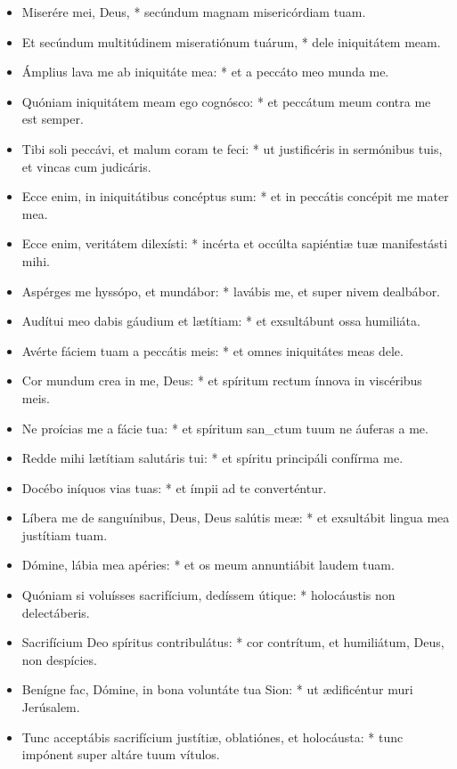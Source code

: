 \begin{itemize}[%
label=\null, %
leftmargin=0pt, %
itemindent=3mm, %
labelsep=0pt, %
labelwidth=0pt, %
rightmargin=0pt, %
parsep=0pt, %
topsep=0pt, %
itemsep=0pt]%


\item Miserére mei, Deus, * secúndum magnam misericórdiam tuam.
\item Et secúndum multitúdinem miseratiónum tuárum, * dele iniquitátem meam.
\item Ámplius lava me ab iniquitáte mea: * et a peccáto meo munda me.
\item Quóniam iniquitátem meam ego cognósco: * et peccátum meum contra me est semper.
\item Tibi soli peccávi, et malum coram te feci: * ut justificéris in sermónibus tuis, et vincas cum judicáris.
\item Ecce enim, in iniquitátibus concéptus sum: * et in peccátis concépit me mater mea.
\item Ecce enim, veritátem dilexísti: * incérta et occúlta sapiéntiæ tuæ manifestásti mihi.
\item Aspérges me hyssópo, et mundábor: * lavábis me, et super nivem dealbábor.
\item Audítui meo dabis gáudium et lætítiam: * et exsultábunt ossa humiliáta.
\item Avérte fáciem tuam a peccátis meis: * et omnes iniquitátes meas dele.
\item Cor mundum crea in me, Deus: * et spíritum rectum ínnova in viscéribus meis.
\item Ne proícias me a fácie tua: * et spíritum san\_ctum tuum ne áuferas a me.
\item Redde mihi lætítiam salutáris tui: * et spíritu principáli confírma me.
\item Docébo iníquos vias tuas: * et ímpii ad te converténtur.
\item Líbera me de sanguínibus, Deus, Deus salútis meæ: * et exsultábit lingua mea justítiam tuam.
\item Dómine, lábia mea apéries: * et os meum annuntiábit laudem tuam.
\item Quóniam si voluísses sacrifícium, dedíssem útique: * holocáustis non delectáberis.
\item Sacrifícium Deo spíritus contribulátus: * cor contrítum, et humiliátum, Deus, non despícies.
\item Benígne fac, Dómine, in bona voluntáte tua Sion: * ut ædificéntur muri Jerúsalem.
\item Tunc acceptábis sacrifícium justítiæ, oblatiónes, et holocáusta: * tunc impónent super altáre tuum vítulos.

\end{itemize}